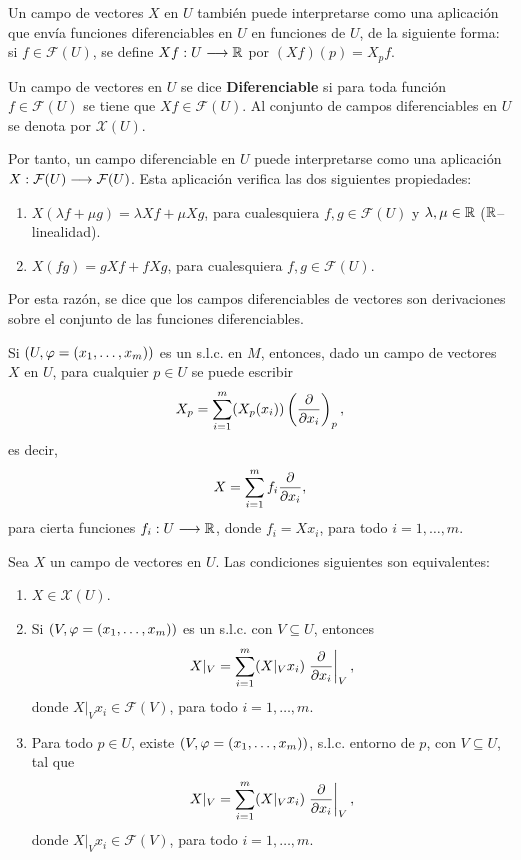 \documentclass[Cursovd_portada.tex]{subfiles}
\begin{document}
Un campo de vectores $X$ en $U$ también puede interpretarse como una aplicación que envía funciones diferenciables
en $U$ en funciones de $U$, de la siguiente forma: si $f\in\mathcal{F}(U)$, se define $Xf:U\longrightarrow\mathbb{R}$ por
$(Xf)(p)=X_pf$.
\begin{defi}
Un campo de vectores en $U$ se dice {\bf Diferenciable} si para toda función $f\in\mathcal{F}(U)$ se tiene que
$Xf\in\mathcal{F}(U)$. Al conjunto de campos diferenciables en $U$ se denota por $\mathcal{X}(U)$.
\end{defi}
Por tanto, un campo diferenciable en $U$ puede interpretarse como una aplicación
$X:\mathcal{F}(U)\longrightarrow\mathcal{F}(U)$. Esta aplicación verifica las dos siguientes propiedades:
\begin{enumerate}
\item $X(\lambda f+\mu g)=\lambda Xf+\mu Xg$, para cualesquiera $f,g\in\mathcal{F}(U)$ y $\lambda,\mu\in\mathbb{R}$
($\mathbb{R}$--linealidad).
\item $X(fg)=gXf+fXg$, para cualesquiera $f,g\in\mathcal{F}(U)$.
\end{enumerate}
\hs Por esta razón, se dice que los campos diferenciables de vectores son derivaciones sobre el conjunto de las
funciones diferenciables.
\par
\begin{lemma}
Si $(U,\varphi=(x_1,\dots ,x_m))$ es un s.l.c. en $M$, entonces, dado un campo de vectores $X$ en $U$,
para cualquier $p\in U$ se puede escribir
$$X_p=\sum_{i=1}^m(X_p(x_i))\left(\displaystyle{\frac{\partial}{\partial x_i}}\right)_p,$$
es decir,
$$X=\sum_{i=1}^mf_i\displaystyle{\frac{\partial}{\partial x_i}},$$
para cierta funciones $f_i:U\longrightarrow\mathbb{R}$, donde $f_i=Xx_i$, para todo
$i=1,\dots ,m$.
\end{lemma}
\begin{prop}
Sea $X$ un campo de vectores en $U$. Las condiciones siguientes son equivalentes:
\begin{enumerate}
\item $X\in\mathcal{X}(U)$. \item Si $(V,\varphi=(x_1,\dots ,x_m))$ es
un s.l.c. con $V\subseteq U$, entonces
$$X|_V=\sum_{i=1}^m(X|_Vx_i)\left.\displaystyle{\frac{\partial}{\partial x_i}}\right\vert_V,$$
donde $X|_Vx_i\in\mathcal{F}(V)$, para todo $i=1,\dots ,m$. \item
Para todo $p\in U$, existe $(V,\varphi=(x_1,\dots ,x_m))$, s.l.c.
entorno de $p$, con $V\subseteq U$, tal que
$$X|_V=\sum_{i=1}^m(X|_Vx_i)\left.\displaystyle{\frac{\partial}{\partial x_i}}\right\vert_V,$$
donde $X|_Vx_i\in\mathcal{F}(V)$, para todo $i=1,\dots ,m$.
\end{enumerate}
\end{prop}
\end{document}
